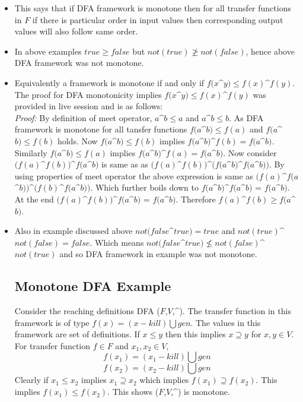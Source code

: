 \begin{itemize}
    \item This says that if DFA framework is monotone then for all transfer functions in $F$ if there is particular order in input values then corresponding output values will also follow same order.
    \item In above examples $true \geq false$ but $not(true) \ngeq not(false)$, hence above DFA framework was not monotone.
    \item Equivalently a framework is monotone if and only if $f(x$\^{}$y) \leq f(x)$\^{}$f(y)$.
    The proof for DFA monotonicity implies $f(x$\^{}$y) \leq f(x)$\^{}$f(y)$ was provided in live session and is as follows:\\
    \textit{Proof:} By definition of meet operator,
    $a$\^{}$b \leq a$ and  $a$\^{}$b \leq b$. As DFA framework is monotone for all tansfer functions $f(a$\^{}$b) \leq f(a)$ and $f(a$\^{}$b) \leq f(b)$ holds. Now $f(a$\^{}$b) \leq f(b)$ implies $f(a$\^{}$b)$\^{}$f(b) = f(a$\^{}$b)$. Similarly $f(a$\^{}$b) \leq f(a)$ implies $f(a$\^{}$b)$\^{}$f(a) = f(a$\^{}$b)$. Now consider $(f(a)$\^{}$f(b))$\^{}$f(a$\^{}$b)$ is same as as $(f(a)$\^{}$f(b))$\^{}$(f(a$\^{}$b)$\^{}$f(a$\^{}$b))$. By using properties of meet operator the above expression is same as 
    $(f(a)$\^{}$f(a$\^{}$b))$\^{}$(f(b)$\^{}$f(a$\^{}$b))$. Which further boils down to $f(a$\^{}$b)$\^{}$f(a$\^{}$b)$ = $f(a$\^{}$b)$. At the end $(f(a)$\^{}$f(b))$\^{}$f(a$\^{}$b)$ = $f(a$\^{}$b)$. Therefore $f(a)$\^{}$f(b) \geq f(a$\^{}$b)$.
    \item Also in example discussed above $not(false$\^{}$true) = true$ and $not(true)$\^{}$not(false)=false$. Which means $not(false$\^{}$true) \nleq not(false)$\^{}$not(true)$ and so DFA framework in example was not monotone.

\subsection{Monotone DFA Example}
Consider the reaching definitions DFA ($F$,$V$,\^{}). The transfer function in this framework is of type $f(x) = (x-kill)\bigcup gen$. The values in this framework are set of definitions. If $x\leq y$ then this implies $x \supseteq y$ for $x,y \in V$. For transfer function $f\in F$ and $x_{1},x_{2} \in V$,
\[f(x_{1}) = (x_{1}-kill)\bigcup gen\]
\[f(x_{2}) = (x_{2}-kill)\bigcup gen\]
Clearly if $x_{1} \leq x_{2}$ implies $x_{1} \supseteq x_{2}$ which implies $f(x_{1}) \supseteq f(x_{2})$. This implies $f(x_{1}) \leq f(x_{2})$. This shows ($F$,$V$,\^{}) is monotone. 
\end{itemize}